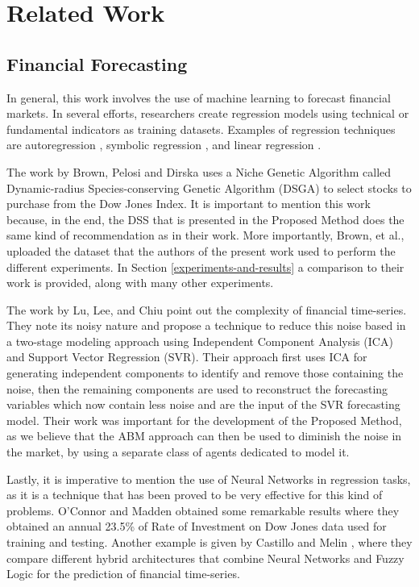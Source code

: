 \chapter{Related Work}
\label{chapter:related-work}


\section{Financial Forecasting}
\label{section:financial-forecasting}


In general, this work involves the use of machine learning to forecast financial
markets. In several efforts, researchers create regression models using
technical or fundamental indicators as training datasets. Examples of regression
techniques are autoregression \cite{burg1968new}, symbolic regression
\cite{billard2002symbolic}, and linear regression \cite{kutner2004applied}.

The work by Brown, Pelosi and Dirska \cite{brown2013dynamic} uses a Niche
Genetic Algorithm called Dynamic-radius Species-conserving Genetic Algorithm
(DSGA) to select stocks to purchase from the Dow Jones Index. It is important to
mention this work because, in the end, the DSS that is presented in the Proposed
Method does the same kind of recommendation as in their work. More importantly,
Brown, et al., uploaded the dataset that the authors of the present work used to
perform the different experiments. In Section \ref{experiments-and-results} a
comparison to their work is provided, along with many other experiments.

The work by Lu, Lee, and Chiu \cite{Lu2009} point out the complexity of
financial time-series. They note its noisy nature and propose a technique to
reduce this noise based in a two-stage modeling approach using Independent
Component Analysis (ICA) and Support Vector Regression (SVR). Their approach
first uses ICA for generating independent components to identify and remove
those containing the noise, then the remaining components are used to
reconstruct the forecasting variables which now contain less noise and are the
input of the SVR forecasting model. Their work was important for the development
of the Proposed Method, as we believe that the ABM approach can then be used to
diminish the noise in the market, by using a separate class of agents dedicated
to model it.

Lastly, it is imperative to mention the use of Neural Networks in regression
tasks, as it is a technique that has been proved to be very effective for this
kind of problems. O'Connor and Madden \cite{Connor2005} obtained some remarkable
results where they obtained an annual 23.5\% of Rate of Investment on Dow Jones
data used for training and testing. Another example is given by Castillo and
Melin \cite{castillo2001simulation}, where they compare different hybrid
architectures that combine Neural Networks and Fuzzy Logic for the prediction of
financial time-series.

